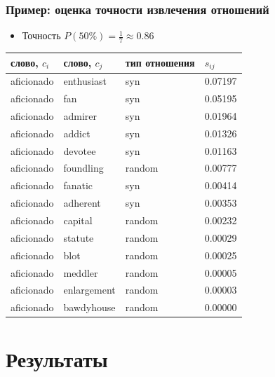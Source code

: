 \documentclass{beamer}
\begin{document}
\begin{frame}
\frametitle{Пример: оценка точности извлечения отношений}

\begin{itemize}
	\item Точность $P(50\%)= \frac{1}{7} \approx 0.86 $
\end{itemize}


\begin{table}[h]\footnotesize
\begin{tabular}{ |l|l|l|l| }
\hline
\bf слово, $c_i$ & \bf  слово, $c_j$ & \bf тип отношения & \bf $s_{ij}$ \\ \hline \hline

aficionado & enthusiast & syn & 0.07197 \\
aficionado & fan & syn & 0.05195 \\
aficionado & admirer & syn & 0.01964 \\
aficionado & addict & syn & 0.01326 \\
aficionado & devotee & syn & 0.01163 \\
aficionado & foundling & random & 0.00777 \\
aficionado & fanatic & syn & 0.00414 \\ \hline
aficionado & adherent & syn & 0.00353 \\
aficionado & capital & random & 0.00232 \\
aficionado & statute & random & 0.00029 \\
aficionado & blot & random & 0.00025 \\
aficionado & meddler & random & 0.00005 \\
aficionado & enlargement & random &	0.00003 \\
aficionado & bawdyhouse & random & 	0.00000 \\ 
\hline
\end{tabular}
\end {table}

\end{frame}

\section{Результаты}
\end{document}
